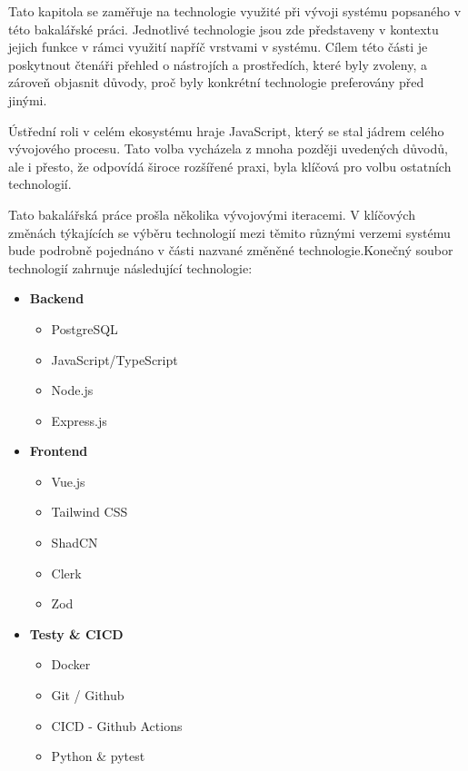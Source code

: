 Tato kapitola se zaměřuje na technologie využité při vývoji systému popsaného v této bakalářské práci. Jednotlivé technologie jsou zde představeny v kontextu jejich funkce v rámci využití napříč vrstvami v systému. Cílem této části je poskytnout čtenáři přehled o nástrojích a prostředích, které byly zvoleny, a zároveň objasnit důvody, proč byly konkrétní technologie preferovány před jinými.

Ústřední roli v celém ekosystému hraje JavaScript, který se stal jádrem celého vývojového procesu. Tato volba vycházela z mnoha později uvedených důvodů, ale i přesto, že odpovídá široce rozšířené praxi, byla klíčová pro volbu ostatních technologií.

Tato bakalářská práce prošla několika vývojovými iteracemi. V klíčových změnách týkajících se výběru technologií mezi těmito různými verzemi systému bude podrobně pojednáno v části nazvané změněné technologie.Konečný soubor technologií zahrnuje následující technologie: 
\begin{itemize}
    \item \textbf{Backend}
        \begin{itemize}
            \item PostgreSQL
            \item JavaScript/TypeScript
            \item Node.js
            \item Express.js
        \end{itemize}
    \item \textbf{Frontend}
        \begin{itemize}
            \item Vue.js
            \item Tailwind CSS
            \item ShadCN
            \item Clerk
            \item Zod
        \end{itemize}
    \item \textbf{Testy \& CICD}
        \begin{itemize}
            \item Docker
            \item Git / Github
            \item CICD - Github Actions
            \item Python \& pytest
        \end{itemize}    
\end{itemize}

